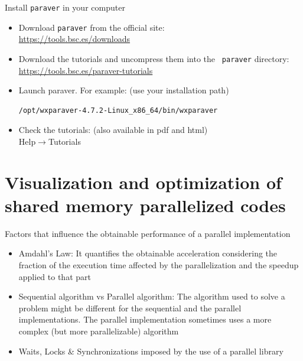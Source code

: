 \documentclass[10pt,xcolor=table]{beamer}
\begin{document}
\begin{frame}[fragile]{Install {\tt paraver} in your computer}
  \begin{itemize}
  \item Download {\tt paraver} from the official site:\\
    \hfil \url{https://tools.bsc.es/downloads}
  \item Download the tutorials and uncompress them into the {\tt
      paraver} directory:\\
    \hfil \url{https://tools.bsc.es/paraver-tutorials}
  \item Launch paraver. For example: (use your installation path)
    \begin{lstlisting}[style=shell,gobble=3]
      /opt/wxparaver-4.7.2-Linux_x86_64/bin/wxparaver
    \end{lstlisting}
  \item Check the tutorials: {\small (also available in pdf and html)}\\
    \hfil Help$\rightarrow$Tutorials
  \end{itemize}
\end{frame}




\section{Visualization and optimization of shared memory parallelized codes}


\begin{frame}{Factors that influence the obtainable performance of a parallel implementation}
\begin{itemize}
    \item Amdahl's Law: It quantifies the obtainable acceleration considering the fraction of the execution time affected by the parallelization and the speedup applied to that part
    \item Sequential algorithm vs Parallel algorithm: The algorithm used to solve a problem might be different for the sequential and the parallel implementations. The parallel implementation sometimes uses a more complex (but more parallelizable) algorithm
    \item Waits, Locks \& Synchronizations imposed by the use of a parallel library
\end{itemize}    
\end{frame}
\end{document}
